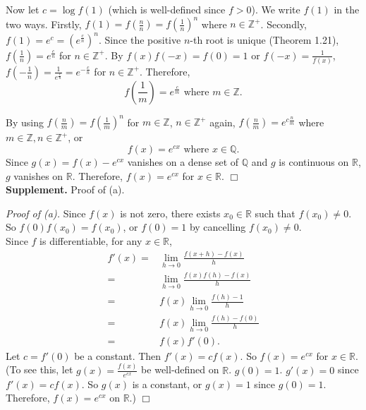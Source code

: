 \documentclass{article}
\begin{document}
Now let $c = \log f(1)$ (which is well-defined since $f > 0$).
We write $f(1)$ in the two ways.
Firstly, $f(1) = f(\frac{n}{n}) = f(\frac{1}{n})^n$ where $n \in \mathbb{Z}^{+}$.
Secondly, $f(1) = e^c = (e^{\frac{c}{n}})^n$.
Since the positive $n$-th root is unique (Theorem 1.21),
$f(\frac{1}{n}) = e^{\frac{c}{n}}$ for $n \in \mathbb{Z}^{+}$.
By $f(x)f(-x) = f(0) = 1$ or $f(-x) = \frac{1}{f(x)}$,
$f(-\frac{1}{n}) = \frac{1}{e^{\frac{c}{n}}} = e^{-\frac{c}{n}}$ for $n \in \mathbb{Z}^{+}$.
Therefore,
$$f\left( \frac{1}{m} \right) = e^{\frac{c}{m}} \text{ where } m \in \mathbb{Z}.$$

By using
$f(\frac{n}{m}) = f(\frac{1}{m})^n$ for $m \in \mathbb{Z}$, $n \in \mathbb{Z}^{+}$ again,
$f(\frac{n}{m}) = e^{c \frac{n}{m}}$ where $m \in \mathbb{Z}, n \in \mathbb{Z}^{+}$, or
$$f(x) = e^{cx} \text{ where } x \in \mathbb{Q}.$$
Since $g(x) = f(x) - e^{cx}$ vanishes on a dense set of $\mathbb{Q}$
and $g$ is continuous on $\mathbb{R}$, $g$ vanishes on $\mathbb{R}$.
Therefore, $f(x) = e^{cx}$ for $x \in \mathbb{R}$.
$\Box$ \\



\textbf{Supplement.} Proof of (a).

\emph{Proof of (a).}
Since $f(x)$ is not zero, there exists $x_0 \in \mathbb{R}$ such that $f(x_0) \neq 0$.
So $f(0)f(x_0) = f(x_0)$, or $f(0) = 1$ by cancelling $f(x_0) \neq 0$. \\

Since $f$ is differentiable, for any $x \in \mathbb{R}$,
\begin{align*}
f'(x)
=& \lim_{h \rightarrow 0} \frac{f(x + h) - f(x)}{h} \\
=& \lim_{h \rightarrow 0} \frac{f(x)f(h) - f(x)}{h} \\
=& f(x) \lim_{h \rightarrow 0} \frac{f(h) - 1}{h} \\
=& f(x) \lim_{h \rightarrow 0} \frac{f(h) - f(0)}{h} \\
=& f(x) f'(0).
\end{align*}
Let $c = f'(0)$ be a constant. Then $f'(x) = c f(x)$. So $f(x) = e^{cx}$ for $x \in \mathbb{R}$.
(To see this, let $g(x) = \frac{f(x)}{e^{cx}}$ be well-defined on $\mathbb{R}$. $g(0) = 1$.
$g'(x) = 0$ since $f'(x) = c f(x)$. So $g(x)$ is a constant, or $g(x) = 1$ since $g(0) = 1$.
Therefore, $f(x) = e^{cx}$ on $\mathbb{R}$.)
$\Box$ \\
\end{document}

